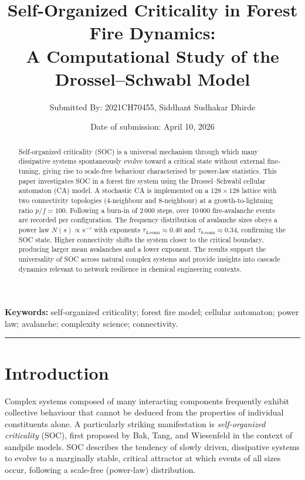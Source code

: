 \documentclass[12pt,a4paper]{article}
\title{\Large\textbf{Self-Organized Criticality in Forest Fire Dynamics:\\
A Computational Study of the Drossel--Schwabl Model}}
\author{Submitted By: 2021CH70455, Siddhant Sudhakar Dhirde}
\date{Date of submission: April 10, 2026}
\begin{document}
\maketitle
\begin{abstract}
\noindent
Self-organized criticality (SOC) is a universal mechanism through which many
dissipative systems spontaneously evolve toward a critical state without
external fine-tuning, giving rise to scale-free behaviour characterised by
power-law statistics. This paper investigates SOC in a forest fire system
using the Drossel--Schwabl cellular automaton (CA) model. A stochastic CA is
implemented on a $128\times128$ lattice with two connectivity topologies
(4-neighbour and 8-neighbour) at a growth-to-lightning ratio $p/f = 100$.
Following a burn-in of 2\,000 steps, over 10\,000 fire-avalanche events are
recorded per configuration. The frequency distribution of avalanche sizes
obeys a power law $N(s)\propto s^{-\tau}$ with exponents
$\tau_{4\text{-conn}} \approx 0.40$ and $\tau_{8\text{-conn}} \approx 0.34$,
confirming the SOC state. Higher connectivity shifts the system closer to the
critical boundary, producing larger mean avalanches and a lower exponent.
The results support the universality of SOC across natural complex systems
and provide insights into cascade dynamics relevant to network resilience
in chemical engineering contexts.
\end{abstract}

\noindent\textbf{Keywords:} self-organized criticality; forest fire model;
cellular automaton; power law; avalanche; complexity science; connectivity.

\bigskip\hrule\bigskip

\section{Introduction}
\label{sec:intro}

Complex systems composed of many interacting components frequently exhibit
collective behaviour that cannot be deduced from the properties of individual
constituents alone. A particularly striking manifestation is
\emph{self-organized criticality} (SOC), first proposed by Bak, Tang, and
Wiesenfeld \cite{bak1987} in the context of sandpile models. SOC describes
the tendency of slowly driven, dissipative systems to evolve to a marginally
stable, critical attractor at which events of all sizes occur, following a
scale-free (power-law) distribution.
\end{document}
